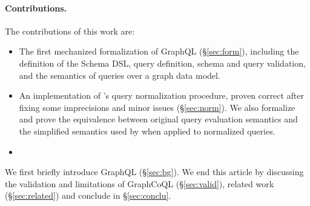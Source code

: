 



\paragraph{Contributions.}
The contributions of this work are:
\begin{itemize}
    \item The first mechanized formalization of GraphQL (\S\ref{sec:form}), including the definition of the Schema DSL, query definition, schema and query validation, and the semantics of queries over a graph data model.
    \item An implementation of \HP{}'s query normalization procedure, proven correct after fixing some imprecisions and minor issues (\S\ref{sec:norm}). We also formalize and prove the equivalence between original query evaluation semantics and the simplified semantics used by \HP{} when applied to normalized queries.
    \item {}
\end{itemize}

We first briefly introduce GraphQL (\S\ref{sec:bg}). 
We end this article by discussing the validation and limitations of GraphCoQL (\S\ref{sec:valid}), related work (\S\ref{sec:related}) and conclude in \S\ref{sec:conclu}.

